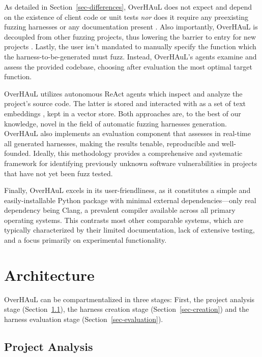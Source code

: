 \documentclass[
  a4paper,
]{scrreprt}
\theoremstyle{definition}
\theoremstyle{remark}
\begin{document}
As detailed in Section~\ref{sec-differences}, OverHAuL does not expect
and depend on the existence of client code or unit tests
\autocite{utopia,fudge,fuzzgen} \emph{nor} does it require any
preexisting fuzzing harnesses \autocite{oss-fuzz-gen} or any
documentation present \autocite{sun2024}. Also importantly, OverHAuL is
decoupled from other fuzzing projects, thus lowering the barrier to
entry for new projects \autocite{oss-fuzz-gen,oss-fuzz}. Lastly, the
user isn't mandated to manually specify the function which the
harness-to-be-generated must fuzz. Instead, OverHAuL's agents examine
and assess the provided codebase, choosing after evaluation the most
optimal target function.

OverHAuL utilizes autonomous ReAct agents which inspect and analyze the
project's source code. The latter is stored and interacted with as a set
of text embeddings \autocite{mikolov2013}, kept in a vector store. Both
approaches are, to the best of our knowledge, novel in the field of
automatic fuzzing harnesses generation. OverHAuL also implements an
evaluation component that assesses in real-time all generated harnesses,
making the results tenable, reproducible and well-founded. Ideally, this
methodology provides a comprehensive and systematic framework for
identifying previously unknown software vulnerabilities in projects that
have not yet been fuzz tested.

Finally, OverHAuL excels in its user-friendliness, as it constitutes a
simple and easily-installable Python package with minimal external
dependencies---only real dependency being Clang, a prevalent compiler
available across all primary operating systems. This contrasts most
other comparable systems, which are typically characterized by their
limited documentation, lack of extensive testing, and a focus primarily
on experimental functionality.

\section{Architecture}\label{sec-architecture}

OverHAuL can be compartmentalized in three stages: First, the project
analysis stage (Section~\ref{sec-analysis}), the harness creation stage
(Section~\ref{sec-creation}) and the harness evaluation stage
(Section~\ref{sec-evaluation}).

\subsection{Project Analysis}\label{sec-analysis}
\end{document}
